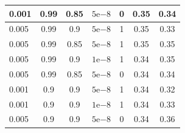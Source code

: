 \begin{table}[]
\begin{tabular}{lcccc|cc|}
\multicolumn{1}{|l|}{0.001}                         & \multicolumn{1}{c|}{0.99}                        & \multicolumn{1}{c|}{0.85}                         & \multicolumn{1}{c|}{$5\mathrm{e}{-8}$}                         & 0       & \multicolumn{1}{c|}{0.35}                         & 0.34    \\ \hline
\multicolumn{1}{|l|}{0.005}                         & \multicolumn{1}{c|}{0.99}                        & \multicolumn{1}{c|}{0.9}                          & \multicolumn{1}{c|}{$5\mathrm{e}{-8}$}                         & 1       & \multicolumn{1}{c|}{0.35}                         & 0.33    \\ \hline
\multicolumn{1}{|l|}{0.005}                         & \multicolumn{1}{c|}{0.99}                        & \multicolumn{1}{c|}{0.85}                         & \multicolumn{1}{c|}{$5\mathrm{e}{-8}$}                         & 1       & \multicolumn{1}{c|}{0.35}                         & 0.35    \\ \hline
\multicolumn{1}{|l|}{0.005}                         & \multicolumn{1}{c|}{0.99}                        & \multicolumn{1}{c|}{0.9}                          & \multicolumn{1}{c|}{$1\mathrm{e}{-8}$}                         & 1       & \multicolumn{1}{c|}{0.34}                         & 0.35    \\ \hline
\multicolumn{1}{|l|}{0.005}                         & \multicolumn{1}{c|}{0.99}                        & \multicolumn{1}{c|}{0.85}                         & \multicolumn{1}{c|}{$5\mathrm{e}{-8}$}                         & 0       & \multicolumn{1}{c|}{0.34}                         & 0.34    \\ \hline
\multicolumn{1}{|l|}{0.001}                         & \multicolumn{1}{c|}{0.9}                         & \multicolumn{1}{c|}{0.9}                          & \multicolumn{1}{c|}{$5\mathrm{e}{-8}$}                         & 1       & \multicolumn{1}{c|}{0.34}                         & 0.32    \\ \hline
\multicolumn{1}{|l|}{0.001}                         & \multicolumn{1}{c|}{0.9}                         & \multicolumn{1}{c|}{0.9}                          & \multicolumn{1}{c|}{$1\mathrm{e}{-8}$}                         & 1       & \multicolumn{1}{c|}{0.34}                         & 0.33    \\ \hline
\multicolumn{1}{|l|}{0.005}                         & \multicolumn{1}{c|}{0.9}                         & \multicolumn{1}{c|}{0.9}                          & \multicolumn{1}{c|}{$5\mathrm{e}{-8}$}                         & 0       & \multicolumn{1}{c|}{0.34}                         & 0.36    \\ \hline

\end{tabular}
\end{table}
